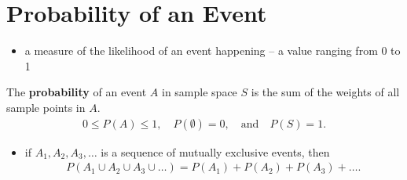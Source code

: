 \documentclass[10pt]{article}
\begin{document}
\section{Probability of an Event}
\begin{itemize}
    \item a measure of the likelihood of an event happening -- a value ranging from 0 to 1
\end{itemize}
\begin{definition}
    The \textbf{probability} of an event $A$ in sample space $S$ is the sum of the weights of all sample points in $A$.
    \begin{align*}
        0 \le P(A) \le 1, \quad P(\emptyset) = 0, \quad \text{and} \quad P(S) = 1
    .\end{align*}
    \begin{itemize}
        \item if $A_1, A_2, A_3, \ldots$ is a sequence of mutually exclusive events, then
            \begin{align*}
                P(A_1 \cup A_2 \cup A_3 \cup \ldots) = P(A_1) + P(A_2) + P(A_3) + \ldots
            .\end{align*}
    \end{itemize}
\end{definition}
\end{document}
